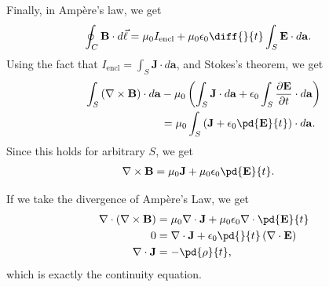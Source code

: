 \documentclass[10pt]{mypackage}
\begin{document}
\begin{derivation}
Finally, in Ampère's law, we get
\begin{align*}
  \oint_{C}\mathbf{B}\cdot d\vec{\ell} &= \mu_0I_{\text{encl}} + \mu_0\epsilon_0 \diff{}{t}\int_{S}\mathbf{E}\cdot d\mathbf{a}.
\end{align*}
Using the fact that $I_{\text{encl}} = \int_{S}\mathbf{J}\cdot d\mathbf{a}$, and Stokes's theorem, we get
\begin{align*}
  \int_{S}\left(\nabla \times \mathbf{B}\right)\cdot d\mathbf{a} &- \mu_0\left(\int_{S}^{} \mathbf{J}\cdot d\mathbf{a} + \epsilon_0 \int_{S}^{} \frac{\partial \mathbf{E}}{\partial t}\cdot d\mathbf{a}\right)\\
                                                                 &= \mu_0\int_{S}^{} \left(\mathbf{J} + \epsilon_0\pd{\mathbf{E}}{t}\right)\cdot d\mathbf{a}.
\end{align*}
Since this holds for arbitrary $S$, we get
\begin{align*}
  \nabla \times \mathbf{B} &= \mu_0\mathbf{J} + \mu_0\epsilon_0 \pd{\mathbf{E}}{t}.
\end{align*}
\end{derivation}
\begin{derivation}
If we take the divergence of Ampère's Law, we get
\begin{align*}
  \nabla \cdot \left(\nabla \times \mathbf{B}\right) &= \mu_0\nabla\cdot \mathbf{J} + \mu_0\epsilon_0 \nabla \cdot \pd{\mathbf{E}}{t}\\
  0 &= \nabla \cdot \mathbf{J} + \epsilon_0 \pd{}{t}\left(\nabla \cdot \mathbf{E}\right)\\
  \nabla \cdot \mathbf{J}&= -\pd{\rho}{t},
\end{align*}
which is exactly the continuity equation.
\end{derivation}
\end{document}
